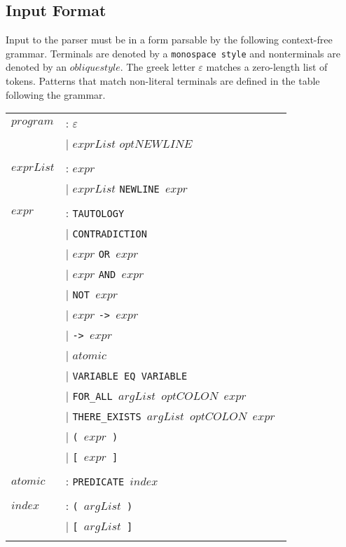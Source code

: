 	\subsection{Input Format}

		Input to the parser must be in a form parsable by the following
		context-free grammar. Terminals are denoted by a {\tt monospace style}
		and nonterminals are denoted by an $oblique style$. The greek letter
		$\varepsilon$ matches a zero-length list of tokens. Patterns that match
		non-literal terminals are defined in the table following the grammar.

		\begin{tabular}{ll}
		$program$ & :    $\varepsilon$ \\
		{} & $\mid$      $exprList$ $optNEWLINE$ \\
		\\

		$exprList$ & :   $expr$ \\
		{} & $\mid$      $exprList$ \tt{NEWLINE} $expr$ \\
		\\

		$expr$ & :       \tt{TAUTOLOGY} \\
		{} & $\mid$      \tt{CONTRADICTION} \\
		{} & $\mid$      $expr$ \tt{OR} $expr$ \\
		{} & $\mid$      $expr$ \tt{AND} $expr$ \\
		{} & $\mid$      \tt{NOT} $expr$ \\
		{} & $\mid$      $expr$ \tt{->} $expr$ \\
		{} & $\mid$      \tt{->} $expr$ \\
		{} & $\mid$      $atomic$ \\
		{} & $\mid$      \tt{VARIABLE EQ VARIABLE} \\
		{} & $\mid$      \tt{FOR\_ALL} $argList$ $optCOLON$ $expr$ \\
		{} & $\mid$      \tt{THERE\_EXISTS} $argList$ $optCOLON$ $expr$ \\
		{} & $\mid$      \tt{(} $expr$ \tt{)} \\
		{} & $\mid$      \tt{[} $expr$ \tt{]} \\
		\\

		$atomic$ & :     \tt{PREDICATE} $index$ \\
		\\

		$index$ & :      \tt{(} $argList$ \tt{)} \\
		{} & $\mid$      \tt{[} $argList$ \tt{]} \\
		\\


\end{tabular}
